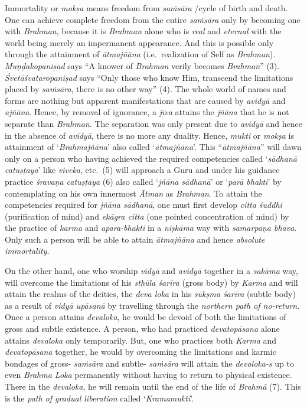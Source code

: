 Immortality or \emph{mokṣa} means freedom from \emph{saṁsāra} /cycle of birth and death. One can achieve complete freedom from the entire \emph{saṁsāra} only by becoming one with \emph{Brahman}, because it is \emph{Brahman} alone who is \emph{real} and \emph{eternal} with the world being merely an impermanent appearance. And this is possible only through the attainment of \emph{ātmajñāna} (i.e.\ realization of Self as \emph{Brahman}). \emph{Muṇḍakopaniṣad} says ``A knower of \emph{Brahman} verily becomes \emph{Brahman}'' (3). \emph{Śvetāśvataropaniṣad} says ``Only those who know Him, transcend the limitations placed by \emph{saṁsāra}, there is no other way'' (4). The whole world of names and forms are nothing but apparent manifestations that are caused by \emph{avidyā} and \emph{ajñāna}. Hence, by removal of ignorance, a \emph{jīva} attains the \emph{jñāna} that he is not separate than \emph{Brahman}. The separation was only present due to \emph{avidyā} and hence in the absence of \emph{avidyā}, there is no more any duality. Hence, \emph{mukti} or \emph{mokṣa} is attainment of `\emph{Brahmajñāna}' also called `\emph{ātmajñāna}'. This ``\emph{ātmajñāna}'' will dawn only on a person who having achieved the required competencies called `\emph{sādhanā catuṣṭaya}' like \emph{viveka}, etc.\ (5) will approach a Guru and under his guidance practice \emph{śravaṇa catuṣṭaya} (6) also called `\emph{jñāna sādhanā}' or `\emph{parā bhakti}' by contemplating on his own innermost \emph{Ātman} as \emph{Brahman}. To attain the competencies required for \emph{jñāna sādhanā}, one must first develop \emph{citta śuddhi} (purification of mind) and \emph{ekāgra citta} (one pointed concentration of mind) by the practice of \emph{karma} and \emph{apara-bhakti} in a \emph{niṣkāma} way with \emph{samarpaṇa bhava}. Only such a person will be able to attain \emph{ātmajñāna} and hence \emph{absolute immortality}.

On the other hand, one who worship \emph{vidyā} and \emph{avidyā} together in a \emph{sakāma} way, will overcome the limitations of his \emph{sthūla śarīra} (gross body) by \emph{Karma} and will attain the realms of the deities, the \emph{deva loka} in his \emph{sūkṣma śarīra} (subtle body) as a result of \emph{vidyā upāsanā} by travelling through the \emph{northern path of no-return}. Once a person attains \emph{devaloka}, he would be devoid of both the limitations of gross and subtle existence. A person, who had practiced \emph{devatopāsana} alone attains \emph{devaloka} only temporarily. But, one who practices both \emph{Karma} and \emph{devatopāsana} together, he would by overcoming the limitations and karmic bondages of gross- \emph{saṁsāra} and subtle- \emph{saṁsāra} will attain the \emph{devaloka-s} up to even \emph{Brahma Loka} permanently without having to return to physical existence. There in the \emph{devaloka}, he will remain until the end of the life of \emph{Brahmā} (7). This is the \emph{path of gradual liberation} called `\emph{Kramamukti}'.

